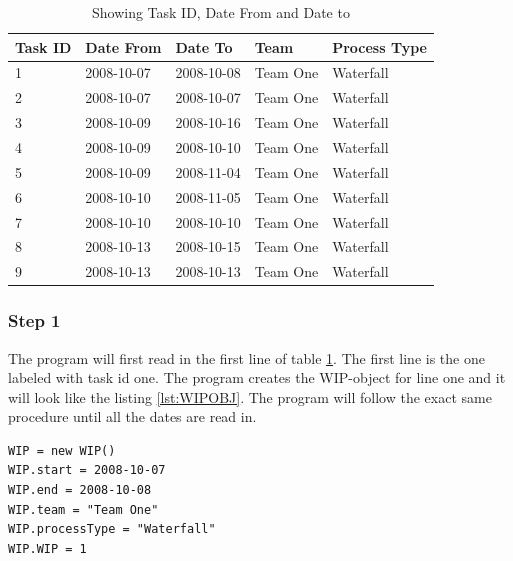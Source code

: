 \documentclass[UKenglish]{ifimaster}  %
\begin{document}
\newpage
\begin{table}[!ht]
\begin{center}
    \begin{tabular}{| l | l | p{2cm} | l | l |}
    \hline
   Task ID &   Date From  & Date To & Team & Process Type\\ \hline
     1 & 2008-10-07 & 2008-10-08 & Team One & Waterfall  \\ \hline
     2 & 2008-10-07 & 2008-10-07 & Team One & Waterfall   \\ \hline
     3 & 2008-10-09 & 2008-10-16 & Team One & Waterfall   \\ \hline
     4 & 2008-10-09 & 2008-10-10 & Team One & Waterfall   \\ \hline
     5 & 2008-10-09 & 2008-11-04 & Team One & Waterfall   \\ \hline
     6 & 2008-10-10 & 2008-11-05 & Team One & Waterfall  \\ \hline
     7 & 2008-10-10 & 2008-10-10 & Team One & Waterfall   \\ \hline
     8 & 2008-10-13 & 2008-10-15 & Team One & Waterfall  \\ \hline
     9 & 2008-10-13 & 2008-10-13  & Team One  & Waterfall   \\ \hline
    \end{tabular}
\caption{Showing Task ID, Date From and Date to}
\label{wt:2} %
\end{center}
\end{table}

\subsubsection{Step 1}
The program will first read in the first line of table \ref{wt:2}.  The first line is the one labeled with task id one.  The program creates the WIP-object for line one and it will look like the listing \ref{lst:WIPOBJ}.  The program will follow the exact same procedure until all the dates are read in. 

\begin{minipage}{\textwidth} 
\begin{lstlisting}[caption={Creating WIP-object},label={lst:WIPOBJ}]
WIP = new WIP()
WIP.start = 2008-10-07
WIP.end = 2008-10-08
WIP.team = "Team One"
WIP.processType = "Waterfall"
WIP.WIP = 1
\end{lstlisting}
  \end{minipage}
\end{document}
